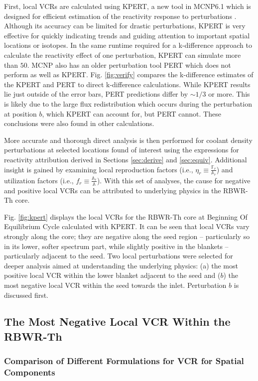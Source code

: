 \documentclass[11pt]{article}
\newcommand{\A}[0]{\mathbb{A}}
\newcommand{\F}[0]{\mathbb{F}}
\newcommand{\tild}[0]{\sim\!\!}
\begin{document}
First, local VCRs are calculated using KPERT, a new tool in MCNP6.1 which is designed for efficient estimation of the reactivity response to perturbations \cite{kiedrowski2011awt}.
Although its accuracy can be limited for drastic perturbations, KPERT is very effective for quickly indicating trends and guiding attention to important spatial locations or isotopes.
In the same runtime required for a k-difference approach to calculate the reactivity effect of one perturbation, KPERT can simulate more than $50$.
MCNP also has an older perturbation tool PERT which does not perform as well as KPERT.
Fig. \ref{fig:verify} compares the k-difference estimates of the KPERT and PERT to direct k-difference calculations.
While KPERT results lie just outside of the error bars, PERT predictions differ by $\tild 1/3$ or more.
This is likely due to the large flux redistribution which occurs during the perturbation at position $b$, which KPERT can account for, but PERT cannot.
These conclusions were also found in other calculations.

More accurate and thorough direct analysis is then performed for coolant density perturbations at selected locations found of interest using the expressions for reactivity attribution derived in Sections \ref{sec:derive} and \ref{sec:equiv}.
Additional insight is gained by examining local reproduction factors (i.e., $\eta_r \equiv \frac{\F_r}{\A_r}$) and utilization factors (i.e., $f_r \equiv \frac{\A_r}{\A}$).
With this set of analyses, the cause for negative and positive local VCRs can be attributed to underlying physics in the RBWR-Th core.

Fig. \ref{fig:kpert} displays the local VCRs for the RBWR-Th core at Beginning Of Equilibrium Cycle calculated with KPERT.
It can be seen that local VCRs vary strongly along the core; they are negative along the seed region -- particularly so in its lower, softer spectrum part, while slightly positive in the blankets -- particularly adjacent to the seed.
Two local perturbations were selected for deeper analysis aimed at understanding the underlying physics: (a) the most positive local VCR within the lower blanket adjacent to the seed and ($b$) the most negative local VCR within the seed towards the inlet.
Perturbation $b$ is discussed first.

\subsection{The Most Negative Local VCR Within the RBWR-Th}
\subsubsection{Comparison of Different Formulations for VCR for Spatial Components}
\end{document}
